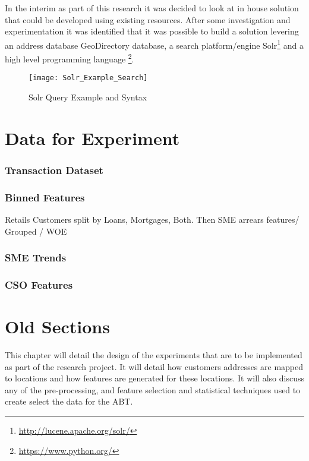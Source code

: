 In the interim as part of this research it was decided to look at in house solution that could be developed using existing resources. After some investigation and experimentation it was identified that it was possible to build a solution levering an address database GeoDirectory database, a search platform/engine Solr\footnote{\url{http://lucene.apache.org/solr/}} and a high level programming language \footnote{\url{https://www.python.org/}}.


\begin{figure}[H]
	\texttt{[image: Solr\_Example\_Search]}
	\caption[Query Example and Syntax]
	{Solr Query Example and Syntax}
	\label{fig:Solr_Example_Search}
\end{figure}

\newpage




\section{Data for Experiment}


\subsubsection{Transaction Dataset}

\subsubsection{Binned Features}

Retails Customers split by Loans, Mortgages, Both. Then SME arrears features/
Grouped / WOE 

\subsubsection{SME Trends}

\subsubsection{CSO Features}



\section{Old Sections}
This chapter will detail the design of the experiments that are to be implemented as part of the research project. It will detail how customers addresses are mapped to locations and how features are generated for these locations. It will also discuss any of the pre-processing, and feature selection and statistical techniques used to create select the data for the ABT.

